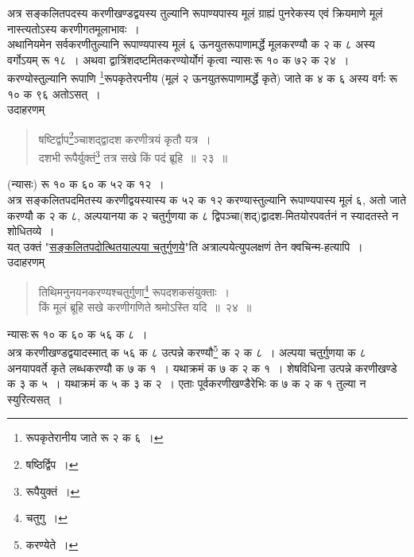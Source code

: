 \documentclass[11pt, openany]{book}
\begin{document}
अत्र सङ्कलितपदस्य करणीखण्डद्वयस्य तुल्यानि रूपाण्यपास्य मूलं ग्राह्यं पुनरेकस्य एवं क्रियमाणे मूलं नास्त्यतोऽस्य करणीगतमूलाभावः~। \\

अथानियमेन सर्वकरणीतुल्यानि रूपाण्यपास्य मूलं ६ ऊनयुतरूपाणामर्द्धे मूलकरण्यौ क २ क ८ अस्य वर्गोऽयम् रू १८~। अथवा द्वात्रिंशदष्टमितकरण्योर्योगं कृत्वा न्यासः\textendash \,रू १० क ७२ क २४~। करण्योस्तुल्यानि रूपाणि \renewcommand{\thefootnote}{१}\footnote{रूपकृतेरानीय जाते रू २ क ६~।}रूपकृतेरपनीय (मूलं २ ऊनयुतरूपाणामर्द्धे कृते) जाते क ४ क ६ अस्य वर्गः रू १० क ९६ अतोऽसत्~। \\

उदाहरणम् \textendash 

\begin{quote}
{\color{red}षष्टिर्द्वाप\renewcommand{\thefootnote}{२}\footnote{षष्ठिर्द्विप~।}ञ्चाशद्द्वादश करणीत्रयं कृतौ यत्र~। \\
दशभी रूपैर्युक्तं\renewcommand{\thefootnote}{३}\footnote{रूपैयुक्तं~।} तत्र सखे किं पदं ब्रूहि~॥~२३~॥}
\end{quote}

(न्यासः) रू १० क ६० क ५२ क १२~। \\

अत्र सङ्कलितपदमितस्य करणीद्वयस्यास्य क ५२ क १२ करण्यास्तुल्यानि रूपाण्यपास्य मूलं ६, अतो जाते करण्यौ क २ क ८, अल्पयानया क २ चतुर्गुणया क ८ द्विपञ्चा(शद्)द्वादश-मितयोरपवर्तनं न स्यादतस्ते न शोधितव्ये~। \\

यत् उक्तं "\hyperref[51]{सङ्कलितपदोत्थितयाल्पया चतुर्गुणये}"ति अत्राल्पयेत्युपलक्षणं तेन क्वचिन्म-हत्यापि~। \\

उदाहरणम् \textendash 

\begin{quote}
{\color{red}तिथिमनुनयनकरण्यश्चतुर्गुणा\renewcommand{\thefootnote}{४}\footnote{चतुगु~।} रूपदशकसंयुक्ताः~। \\
किं मूलं ब्रूहि सखे करणीगणिते श्रमोऽस्ति यदि~॥~२४~॥}
\end{quote}

न्यासः\textendash \,रू १० क ६० क ५६ क ८~। \\

अत्र करणीखण्डद्वयादस्मात् क ५६ क ८ उत्पन्ने करण्यौ\renewcommand{\thefootnote}{५}\footnote{करण्येते~।} क २ क ८~। अल्पया चतुर्गुणया क ८ अनयापवर्ते कृते लब्धकरण्यौ क ७ क १~। यथाक्रमं क ७ क २ क १~। शेषविधिना उत्पन्ने करणीखण्डे क ३ क ५~। यथाक्रमं क ५ क ३ क २~। एताः पूर्वकरणीखण्डैरेभिः क ७ क २ क १ तुल्या न स्युरित्यसत्~। 
\vspace{8mm}
\end{document}

